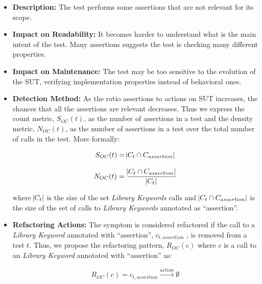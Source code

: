 \begin{itemize}
    \item \textbf{Description:} The test performs some assertions that are not relevant for its scope.

    \item \textbf{Impact on Readability:} It becomes harder to understand what is the main intent of the test. Many assertions suggests the test is checking many different properties.
    
    \item \textbf{Impact on Maintenance:} The test may be too sensitive to the evolution of the SUT, verifying implementation properties instead of behavioral ones.
    
    \item \textbf{Detection Method:} As the ratio assertions to actions on SUT increases, the chances that all the assertions are relevant decreases. Thus we express the count metric, $S_{OC}(t)$, as the number of assertions in a test and the density metric, $N_{OC}(t)$, as the number of assertions in a test over the total number of calls in the test. More formally:
    
    \begin{equation*}
        S_{OC}(t) = \abs{C_{t} \cap C_{assertion}}
    \end{equation*}
    
    \begin{equation*}
        N_{OC}(t) = \frac{ \abs{C_{t} \cap C_{assertion}}}{\abs{C_{t}}}
    \end{equation*}
    
    where $\abs{C_{t}}$ is the size of the set \emph{Library Keywords} calls and $\abs{C_{t} \cap C_{assertion}}$ is the size of the set of calls to \emph{Library Keywords} annotated as ``assertion''.
    
    \item \textbf{Refactoring Actions:} The symptom is considered refactored if the call to a \emph{Library Keyword} annotated with ``assertion'', $c_{t, assertion}$ , is removed from a test $t$. Thus, we propose the refactoring pattern, $R_{OC}(c)$ where $c$ is a call to an \emph{Library Keyword} annotated with ``assertion'' as:
    
    \begin{equation*}
        R_{OC}(c) = c_{t, assertion} \xrightarrow{action} \emptyset
    \end{equation*}
\end{itemize}

